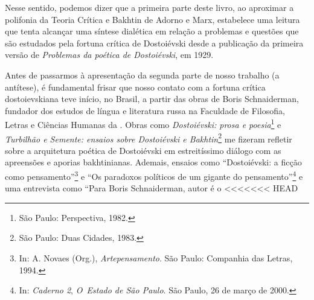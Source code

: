 Nesse sentido, podemos dizer que a primeira parte deste livro, ao
aproximar a polifonia da Teoria Crítica e Bakhtin de Adorno e Marx,
estabelece uma leitura que tenta alcançar uma síntese dialética em
relação a problemas e questões que são estudados pela fortuna crítica de
Dostoiévski desde a publicação da primeira versão de \emph{Problemas da
poética de Dostoiévski}, em 1929.

Antes de passarmos à apresentação da segunda parte de nosso trabalho (a
antítese), é fundamental frisar que nosso contato com a fortuna crítica
dostoievskiana teve início, no Brasil, a partir das obras de Boris
Schnaiderman, fundador dos estudos de língua e literatura russa na
Faculdade de Filosofia, Letras e Ciências Humanas da . Obras como
\emph{Dostoiévski: prosa e poesia}\footnote{São Paulo: Perspectiva,
  1982.} e \emph{Turbilhão e Semente: ensaios sobre Dostoiévski e
Bakhtin}\footnote{São Paulo: Duas Cidades, 1983.} me fizeram refletir
sobre a arquitetura poética de Dostoiévski em estreitíssimo diálogo com
as apreensões e aporias bakhtinianas. Ademais, ensaios como
``Dostoiévski: a ficção como pensamento''\footnote{In: A. Novaes (Org.),
  \emph{Artepensamento}. São Paulo: Companhia das Letras, 1994.} e ``Os
paradoxos políticos de um gigante do pensamento''\footnote{In:
  \emph{Caderno 2}, \emph{O~Estado de São Paulo}. São Paulo, 26 de março
  de 2000.} e uma entrevista como ``Para Boris Schnaiderman, autor é o
<<<<<<< HEAD
